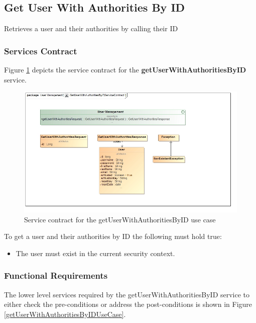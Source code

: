 \subsection{Get User With Authorities By ID}
Retrieves a user and their authorities by calling their ID

\subsubsection{Services Contract}
Figure \ref{fig:GetUserWithAuthoritiesByIDServicesContract} depicts the service contract for the \textbf{getUserWithAuthoritiesByID} service.

\begin{figure}[H]
	\begin{center}
		\includegraphics[scale=0.55]{../Diagrams and Charts/Users/Get User With Authorities By ID Service Contract.jpg}
		\caption{Service contract for the getUserWithAuthoritiesByID use case}
		\label{fig:GetUserWithAuthoritiesByIDServicesContract}
	\end{center}
\end{figure}

To get a user and their authorities by ID the following must hold true:
\begin{itemize}
	\item The user must exist in the current security context.
\end{itemize}

\subsubsection{Functional Requirements}
The lower level services required by the getUserWithAuthoritiesByID service to either check the
pre-conditions or address the post-conditions is shown in Figure \ref{getUserWithAuthoritiesByIDUseCase}.


